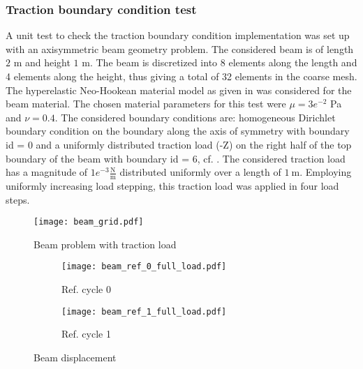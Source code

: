 \subsubsection{Traction boundary condition test}
A unit test to check the traction boundary condition implementation was set up with an axisymmetric beam geometry problem. The considered beam is of length $2$ m and height $1$ m. The beam is discretized into 8 elements along the length and 4 elements along the height, thus giving a total of 32 elements in the coarse mesh. The hyperelastic Neo-Hookean material model as given in  was considered for the beam material. The chosen material parameters for this test were $\mu = 3e^{-2}$ Pa and $\nu = 0.4$. The considered boundary conditions are: homogeneous Dirichlet boundary condition on the boundary along the axis of symmetry with boundary id = 0 and a uniformly distributed traction load (-Z) on the right half of the top boundary of the beam with boundary id = 6, cf. . The considered traction load has a magnitude of $1e^{-3} \frac{\text{N}}{\text{m}}$ distributed uniformly over a length of $1 \ \text{m}$. Employing uniformly increasing load stepping, this traction load was applied in four load steps. \par    

\begin{figure}[h]
\centering 
\texttt{[image: beam\_grid.pdf]}
\caption{Beam problem with traction load}
\label{fig:2.4}
\end{figure} 

\begin{figure}[h]
\centering
\begin{subfigure}[b]{0.45\textwidth}
\centering
\texttt{[image: beam\_ref\_0\_full\_load.pdf]}
\caption{Ref. cycle 0}
\label{fig:2.5.2}
\end{subfigure}
\begin{subfigure}[b]{0.45\textwidth}
\centering
\texttt{[image: beam\_ref\_1\_full\_load.pdf]}
\caption{Ref. cycle 1}
\label{fig:2.5.4}
\end{subfigure}
\caption{Beam displacement}
\label{fig:2.5}
\end{figure}

